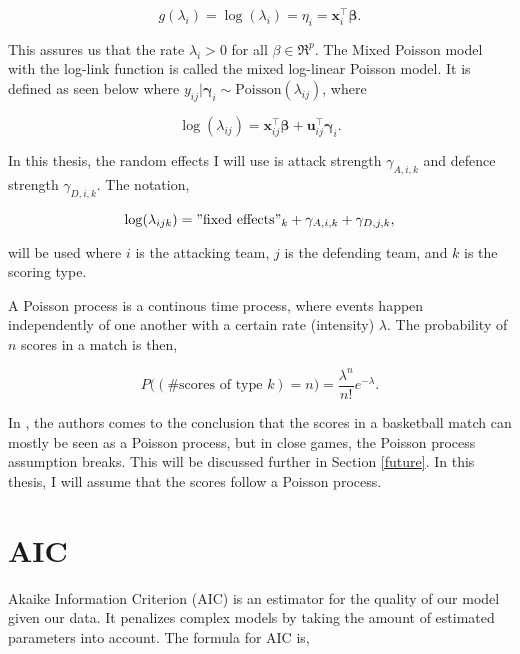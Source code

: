 \begin{equation}
g(\lambda_i) = \log(\lambda_i) = \eta_i = \mathbf{x}_i^\top \boldsymbol{\beta}.
\label{eqn:explink}
\end{equation}

\noindent This assures us that the rate $\lambda_i > 0$ for all $\beta \in \Re^p$. The Mixed Poisson model with the log-link function is called the mixed log-linear Poisson model. It is defined as seen below where $y_{ij}|\boldsymbol{\gamma}_i \sim \text{Poisson}(\lambda_{ij})$, where

\begin{equation}
\log(\lambda_{ij}) = \mathbf{x}_{ij}^\top \boldsymbol{\beta} + \mathbf{u}_{ij}^\top \boldsymbol{\gamma}_i.
\label{eqn:logLinkGLMM}
\end{equation}

\noindent In this thesis, the random effects I will use is attack strength $\gamma_{A,i,k}$ and defence strength $\gamma_{D,i,k}$. The notation,

\begin{equation}
\log(\lambda_{ijk}) = "\text{fixed effects}"_k + \gamma_{A,i,k} + \gamma_{D,j,k},
\label{eqn:logLinkGLMMbasket}
\end{equation}

\noindent will be used where $i$ is the attacking team, $j$ is the defending team, and $k$ is the scoring type.

A Poisson process is a continous time process, where events happen independently of one another with a certain rate (intensity) $\lambda$. The probability of $n$ scores in a match is then, 

\begin{equation}
P\big((\text{\# scores of type } k) = n\big) = \frac{\lambda^n}{n!} e^{-\lambda}.
\label{eqn:poipro}
\end{equation}

\noindent In \cite{poissonNBA}, the authors comes to the conclusion that the scores in a basketball match can mostly be seen as a Poisson process, but in close games, the Poisson process assumption breaks. This will be discussed further in Section \ref{future}. In this thesis, I will assume that the scores follow a Poisson process. 

\section{AIC}

\noindent Akaike Information Criterion (AIC) is an estimator for the quality of our model given our data. It penalizes complex models by taking the amount of estimated parameters into account. The formula for AIC is,

